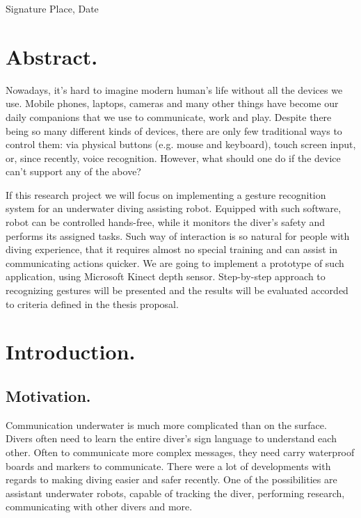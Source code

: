 \documentclass[a4paper,11pt,oneside]{article}
\begin{document}
\vspace{20mm}

Signature \hfill Place, Date

\newpage

\section*{Abstract.}

Nowadays, it's hard to imagine modern human's life without all the devices we use. Mobile phones, laptops, cameras and many other things have become our daily companions that we use to communicate, work and play. Despite there being so many different kinds of devices, there are only few traditional ways to control them: via physical buttons (e.g. mouse and keyboard), touch screen input, or, since recently, voice recognition. However, what should one do if the device can't support any of the above?

If this research project we will focus on implementing a gesture recognition system for an underwater diving assisting robot. Equipped with such software, robot can be controlled hands-free, while it monitors the diver's safety and performs its assigned tasks. Such way of interaction is so natural for people with diving experience, that it requires almost no special training and can assist in communicating actions quicker. We are going to implement a prototype of such application, using Microsoft Kinect depth sensor. Step-by-step approach to recognizing gestures will be presented and the results will be evaluated accorded to criteria defined in the thesis proposal.

\newpage
\tableofcontents

\clearpage
{}

\section{Introduction.}

\subsection{Motivation.}

Communication underwater is much more complicated than on the surface. Divers often need to learn the entire diver's sign language to understand each other. Often to communicate more complex messages, they need carry waterproof boards and markers to communicate. There were a lot of developments with regards to making diving easier and safer recently. One of the possibilities are assistant underwater robots, capable of tracking the diver, performing research, communicating with other divers and more.
\end{document}
